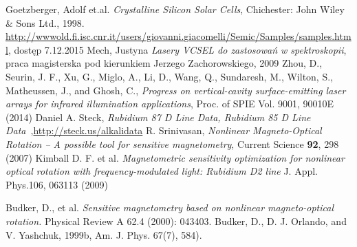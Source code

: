 \documentclass[a4paper,10pt,twoside]{article}
\begin{document}
\begin{thebibliography}{99}
 Goetzberger, Adolf et.al. \emph{Crystalline Silicon Solar Cells}, Chichester: John Wiley \& Sons Ltd., 1998.
 \url{http://wwwold.fi.isc.cnr.it/users/giovanni.giacomelli/Semic/Samples/samples.html}, dostęp 7.12.2015
  Mech, Justyna \emph{Lasery VCSEL do zastosowań w spektroskopii}, praca magisterska pod kierunkiem Jerzego Zachorowskiego, 2009
 Zhou, D., Seurin, J. F., Xu, G., Miglo, A., Li, D., Wang, Q., Sundaresh, M., Wilton, S., Matheussen, J., and  Ghosh, C., \emph{Progress on vertical-cavity surface-emitting laser arrays for infrared illumination applications},  Proc. of SPIE Vol. 9001, 90010E (2014)
 Daniel A. Steck, \emph{Rubidium 87 D Line Data, Rubidium 85 D Line Data}~,\url{http://steck.us/alkalidata}
 R. Srinivasan,\textit{ Nonlinear Magneto-Optical Rotation – A possible tool for sensitive magnetometry}, Current Science \textbf{92}, 298 (2007)
 Kimball D. F. et al.  \emph{Magnetometric sensitivity optimization for nonlinear optical rotation with
frequency-modulated light: Rubidium D2 line} J. Appl. Phys.106, 063113 (2009)


 Budker, D., et al. \emph{Sensitive magnetometry based on nonlinear magneto-optical rotation.} Physical Review A 62.4 (2000): 043403.
 Budker, D., D. J. Orlando, and V. Yashchuk, 1999b, Am. J. Phys. 67(7), 584).

\end{thebibliography}
\end{document}
